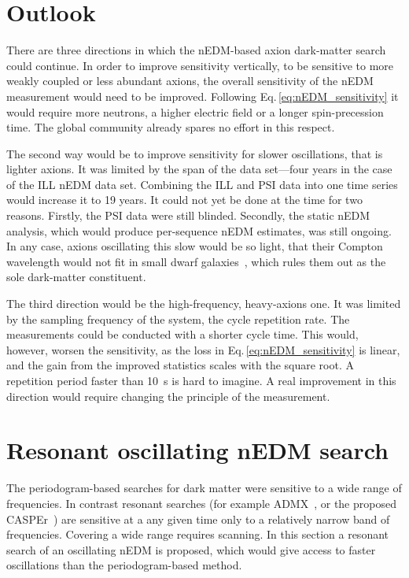 \section{Outlook}
There are three directions in which the nEDM-based axion dark-matter search could continue.
In order to improve sensitivity vertically, to be sensitive to more weakly coupled or less abundant axions, the overall sensitivity of the nEDM measurement would need to be improved.
Following Eq.\,\ref{eq:nEDM_sensitivity} it would require more neutrons, a higher electric field or a longer spin-precession time.
The global community already spares no effort in this respect.

The second way would be to improve sensitivity for slower oscillations, that is  lighter axions.
It was limited by the span of the data set---four years in the case of the ILL nEDM data set.
Combining the ILL and PSI data into one time series would increase it to 19 years.
It could not yet be done at the time for two reasons.
Firstly, the PSI data were still blinded.
Secondly, the static nEDM analysis, which would produce per-sequence nEDM estimates, was still ongoing.
In any case, axions oscillating this slow would be so light, that their Compton wavelength would not fit in small dwarf galaxies~\cite{Marsh2015Review}, which rules them out as the sole dark-matter constituent.

The third direction would be the high-frequency, heavy-axions one.
It was limited by the sampling frequency of the system, the cycle repetition rate.
The measurements could be conducted with a shorter cycle time.
This would, however, worsen the sensitivity, as the loss in Eq.\,\ref{eq:nEDM_sensitivity} is linear, and the gain from the improved statistics scales with the square root.
A repetition period faster than \SI{10}{\second} is hard to imagine.
A real improvement in this direction would require changing the principle of the measurement.




\section{Resonant oscillating nEDM search}
The periodogram-based searches for dark matter were sensitive to a wide range of frequencies.
In contrast resonant searches (for example ADMX~\cite{PhysRevLett.104.041301}, or the proposed CASPEr~\cite{CASPEr2014}) are sensitive at a any given time only to a relatively narrow band of frequencies.
Covering a wide range requires scanning.
In this section a resonant search of an oscillating nEDM is proposed, which would give access to faster oscillations than the periodogram-based method.

